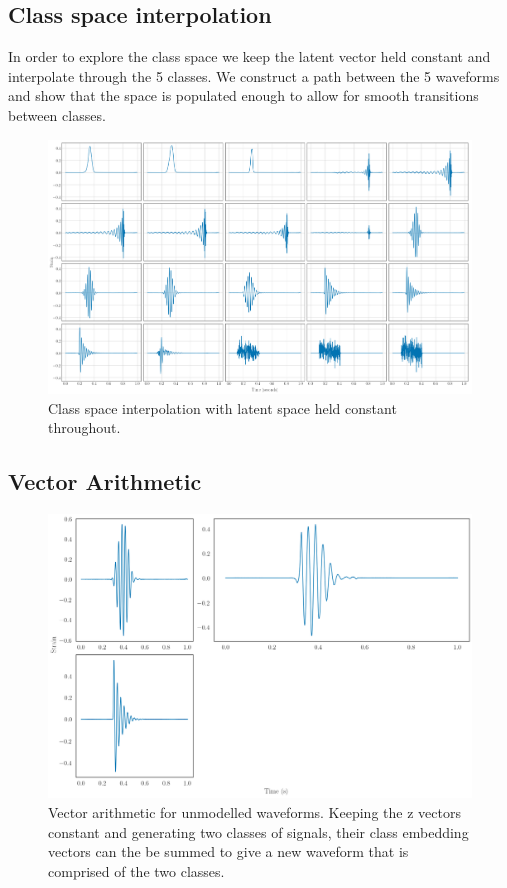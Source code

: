 \documentclass[12pt]{iopart}
\begin{document}
\subsection{Class space interpolation}
In order to explore the class space we keep the latent vector held constant and interpolate through the 5 classes. We construct a path between the 5 waveforms and show that the space is populated enough to allow for smooth transitions between classes. 
\begin{figure}
    \centering
    \includegraphics[width=\textwidth]{figures/fixed_z_slerp.png}
    \caption{Class space interpolation with latent space held constant throughout.}
    \label{fig:c_interp}
\end{figure}

\subsection{Vector Arithmetic}
\begin{figure}
    \centering
    \includegraphics[width=\textwidth]{figures/adding.png}
    \caption{Vector arithmetic for unmodelled waveforms. Keeping the z vectors constant and generating two classes of signals, their class embedding vectors can the be summed to give a new waveform that is comprised of the two classes.}
    \label{fig:add}
\end{figure}
\end{document}
